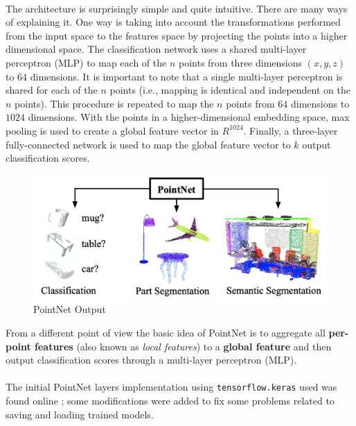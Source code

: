 \documentclass[11pt,a4paper]{article}
\begin{document}
\\
The architecture is surprisingly simple and quite intuitive. There are many ways of explaining it. One way \cite{mediumcompointnet} is taking into account the transformations performed from the input space to the features space by projecting the points into a higher dimensional space. The classification network uses a shared multi-layer perceptron (MLP) to map each of the $n$ points from three dimensions $(x, y, z)$ to $64$ dimensions. It is important to note that a single multi-layer perceptron is shared for each of the $n$ points (i.e., mapping is identical and independent on the $n$ points). This procedure is repeated to map the $n$ points from $64$ dimensions to $1024$ dimensions. With the points in a higher-dimensional embedding space, max pooling is used to create a global feature vector in $R^{1024}$. Finally, a three-layer fully-connected network is used to map the global feature vector to $k$ output classification scores.
\begin{figure}[H]
    \centering
    \includegraphics[scale=0.26]{imgs/pointnet-output.png}
    \caption{PointNet Output}
\end{figure}
\noindent
From a different point of view \cite{Zhang_2019_CVPR_Workshops} the basic idea of PointNet is to aggregate all \textbf{per-point features} (also known as \textit{local features}) to a \textbf{global feature} and then output classification scores through a multi-layer perceptron (MLP).\\
\\
The initial PointNet layers implementation using \texttt{tensorflow.keras} used was found online \cite{mediumcompointnet}; some modifications were added to fix some problems related to saving and loading trained models.
\end{document}
